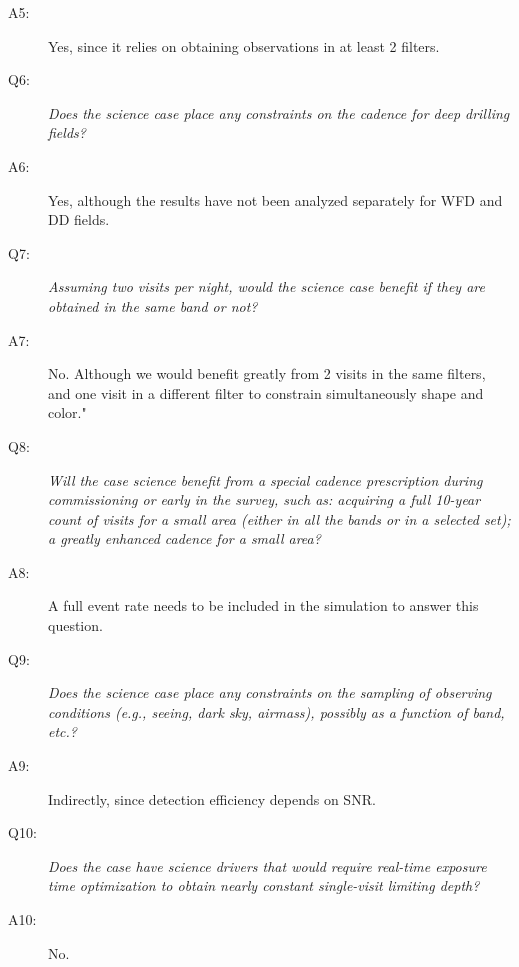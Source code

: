 \begin{description}
 \item[A5:] Yes, since it relies on obtaining observations in at least 2 filters.


 \item[Q6:] {\it Does the science case place any constraints on the
 cadence for deep drilling fields?}

 \item[A6:] Yes, although the results have not been analyzed separately for WFD and DD fields.


 \item[Q7:] {\it Assuming two visits per night, would the science case
 benefit if they are obtained in the same band or not?}

 \item[A7:] No. Although  we would benefit greatly from 2 visits in the same filters, and one visit in a different filter to constrain simultaneously shape and color."


 \item[Q8:] {\it Will the case science benefit from a special cadence
 prescription during commissioning or early in the survey, such as:
 acquiring a full 10-year count of visits for a small area (either in
 all the bands or in a  selected set); a greatly enhanced cadence for a
 small area?}

 \item[A8:] A full event rate needs to be included in the simulation to answer this question.


 \item[Q9:] {\it Does the science case place any constraints on the
 sampling of observing conditions (e.g., seeing, dark sky, airmass),
 possibly as a function of band, etc.?}

 \item[A9:] Indirectly, since detection efficiency depends on SNR.


 \item[Q10:] {\it Does the case have science drivers that would require
 real-time exposure time optimization to obtain nearly constant
 single-visit limiting depth?}

 \item[A10:] No.

 \end{description}
